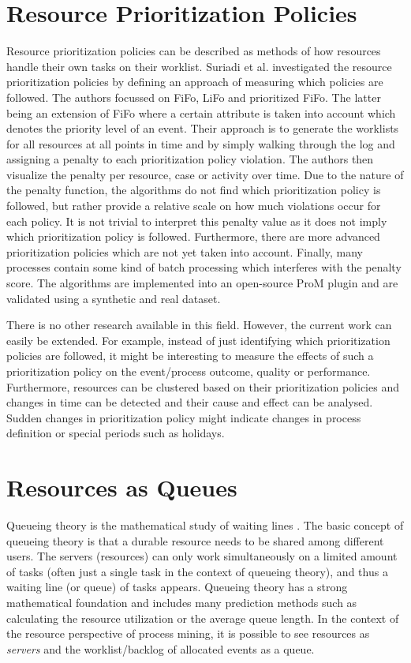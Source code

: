 \section{Resource Prioritization Policies} \label{section:prioritization}
Resource prioritization policies can be described as methods of how resources handle their own tasks on their worklist. Suriadi et al. \cite{Suriadi2015} investigated the resource prioritization policies by defining an approach of measuring which policies are followed. The authors focussed on FiFo, LiFo and prioritized FiFo. The latter being an extension of FiFo where a certain attribute is taken into account which denotes the priority level of an event. Their approach is to generate the worklists for all resources at all points in time and by simply walking through the log and assigning a penalty to each prioritization policy violation. The authors then visualize the penalty per resource, case or activity over time. Due to the nature of the penalty function, the algorithms do not find which prioritization policy is followed, but rather provide a relative scale on how much violations occur for each policy. It is not trivial to interpret this penalty value as it does not imply which prioritization policy is followed. Furthermore, there are more advanced prioritization policies which are not yet taken into account. Finally, many processes contain some kind of batch processing which interferes with the penalty score. The algorithms are implemented into an open-source ProM plugin and are validated using a synthetic and real dataset. 

There is no other research available in this field. However, the current work can easily be extended. For example, instead of just identifying which prioritization policies are followed, it might be interesting to measure the effects of such a prioritization policy on the event/process outcome, quality or performance. Furthermore, resources can be clustered based on their prioritization policies and changes in time can be detected and their cause and effect can be analysed. Sudden changes in prioritization policy might indicate changes in process definition or special periods such as holidays. 

\section{Resources as Queues} \label{section:queues}
Queueing theory is the mathematical study of waiting lines \cite{gross2008fundamentals, wolff1989stochastic}. The basic concept of queueing theory is that a durable resource needs to be shared among different users. The servers (resources) can only work simultaneously on a limited amount of tasks (often just a single task in the context of queueing theory), and thus a waiting line (or queue) of tasks appears. Queueing theory has a strong mathematical foundation and includes many prediction methods such as calculating the resource utilization or the average queue length. In the context of the resource perspective of process mining, it is possible to see resources as \textit{servers} and the worklist/backlog of allocated events as a queue. 

